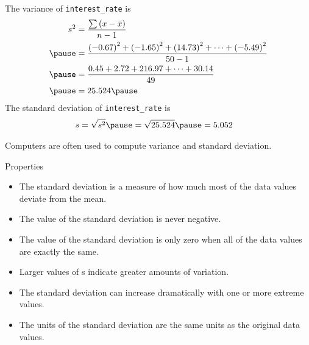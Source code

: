 \documentclass{beamer}
\begin{document}
\begin{frame}
\begin{example}
The variance of \texttt{interest\_rate} is
\begin{equation*}
\begin{aligned}
s^2 &= \dfrac{\sum \left(x-\bar{x}\right)}{n-1}\\\pause
&=  \dfrac{{(-0.67)}^2+{(-1.65)}^2+{(14.73)}^2+\cdots+{(-5.49)}^2}{50-1}  \\\pause
&= \dfrac{0.45+2.72+216.97+\cdots+30.14}{49} \\\pause
&= 25.524\pause
\end{aligned}
\end{equation*}
The standard deviation of \texttt{interest\_rate} is
\begin{equation*}
\begin{aligned}
s &= \sqrt{s^2} \pause = \sqrt{25.524} \pause = 5.052
\end{aligned}
\end{equation*}
\end{example}\pause
\begin{note}
Computers are often used to compute variance and standard deviation.
\end{note}
\end{frame}

\begin{frame}
\begin{block}{Properties}
\begin{itemize}[<+- | alert@+>]
\item The standard deviation is a measure of how much most of the data values deviate from the mean.
\item The value of the standard deviation is never negative.
\item The value of the standard deviation is only zero when all of the data values are exactly the same.
\item Larger values of s indicate greater amounts of variation.
\item The standard deviation can increase dramatically with one or more extreme values.
\item The units of the standard deviation are the same units as the original data values.
\end{itemize}
\end{block}
\end{frame}
\end{document}

